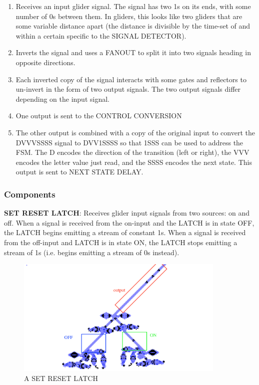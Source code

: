 \documentclass{article}
\begin{document}
\begin{enumerate}
\item Receives an input glider signal. The signal has two 1s on its ends, with some number of 0s between them. In gliders, this looks like two gliders that are some variable distance apart (the distance is divisible by the time-set of and within a certain specific to the SIGNAL DETECTOR).


\item Inverts the signal and uses a FANOUT to split it into two signals heading in opposite directions.


\item Each inverted copy of the signal interacts with some gates and reflectors to un-invert in the form of two output signals. The two output signals differ depending on the input signal.


\item One output is sent to the CONTROL CONVERSION


\item The other output is combined with a copy of the original input to convert the DVVVSSSS signal to DVV1SSSS so that 1SSS can be used to address the FSM. The D encodes the direction of the transition (left or right), the VVV encodes the letter value just read, and the SSSS encodes the next state. This output is sent to NEXT STATE DELAY.

\end{enumerate}

\subsubsection{Components}
\noindent\textbf{SET RESET LATCH}: Receives glider input signals from two sources: on and off. When a signal is received from the on-input and the LATCH is in state OFF, the LATCH begins emitting a stream of constant 1s. When a signal is received from the off-input and LATCH is in state ON, the LATCH stops emitting a stream of 1s (i.e. begins emitting a stream of 0s instead).

\vspace{1em}

\begin{figure}[h]
\centering
\includegraphics[width=10cm,keepaspectratio]{images/SET-RESET-LATCH.png}
\captionsetup{labelformat=empty} \caption{A SET RESET LATCH}
\end{figure}
\end{document}
